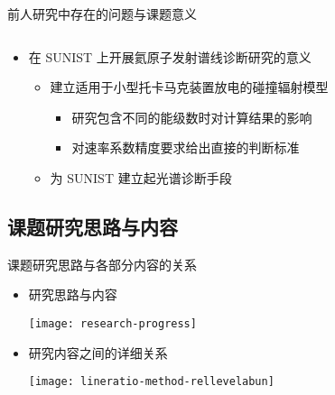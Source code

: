 \begin{CJK*}{UTF8}{kai}
\begin{frame}{前人研究中存在的问题与课题意义}
\begin{columns}
	\end{columns}
	\vspace{-1.2em}
	\begin{itemize}
		\item 在 SUNIST 上开展氦原子发射谱线诊断研究的意义
			\begin{itemize}
				\item 建立适用于小型托卡马克装置放电的碰撞辐射模型
					\begin{itemize}
						\item 研究包含不同的能级数时对计算结果的影响
						\item 对速率系数精度要求给出直接的判断标准
					\end{itemize}
				\item 为 SUNIST 建立起光谱诊断手段%
			\end{itemize}
	\end{itemize}
\end{frame}

\subsection{课题研究思路与内容}

\begin{frame}{课题研究思路与各部分内容的关系}
	\begin{itemize}
		\item 研究思路与内容\\
			\begin{center}
			\texttt{[image: research-progress]}
			\end{center}
		\item 研究内容之间的详细关系\\
			\begin{center}
			\texttt{[image: lineratio-method-rellevelabun]}
			\end{center}
	\end{itemize}
\end{frame}


\end{CJK*}
